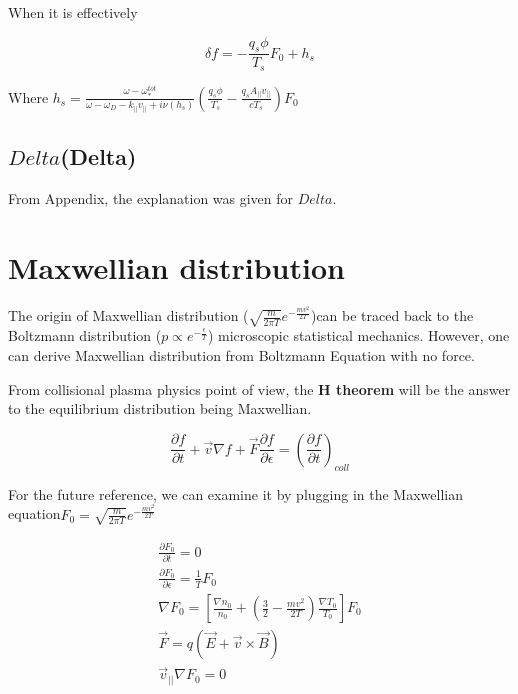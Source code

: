 When it is effectively 

\begin{equation}
    \delta f =-\frac{q_s\phi}{T_s}F_0+h_s
    \label{eq:adiabatic}
\end{equation}

Where $
    h_s 
    =\frac{\omega -\omega_*^{tot} 
    }{\omega -\omega_D 
    - k_{||}v_{||}+i\nu(h_s)}\left(\frac{q_s\phi}{T_s}-\frac{q_sA_{||}v_{||}}{cT_s}\right)F_0
$

\subsection{$Delta$(Delta)}

From \cite{tearing_parity} Appendix, the explanation was given for $Delta$. 



\section{Maxwellian distribution}

The origin of Maxwellian distribution ($\sqrt{\frac{m}{2\pi  T}}e^{-\frac{mv^2}{2T}}$)can be traced back to the Boltzmann distribution ($p\propto e^{-\frac{\epsilon}{T}}$) microscopic statistical mechanics. However, one can derive Maxwellian distribution from Boltzmann Equation with no force. 

From collisional plasma physics point of view, the\textbf{ H theorem} will be the answer to the equilibrium distribution being Maxwellian. 

\begin{equation}
    \frac{\partial f}{\partial t} +\Vec{v} \nabla f +\Vec{F}\frac{\partial f}{\partial \epsilon}=(\frac{\partial f}{\partial t})_{coll}
\end{equation}

For the future reference, we can examine it by plugging in the Maxwellian equation$F_0=\sqrt{\frac{m}{2\pi T}}e^{-\frac{mv^2}{2T}}$

\begin{eqnarray}
 \frac{\partial F_0}{\partial t}=0\\
 \frac{\partial F_0}{\partial \epsilon}=\frac{1}{T}F_0\\
 \nabla F_0 = \left[\frac{\nabla n_0}{n_0}+(\frac{3}{2}-\frac{mv^2}{2T})\frac{\nabla T_0}{T_0}\right]F_0\\
 \vec{F}=q(\vec{E}+\vec{v}\times \vec{B})\\
 \vec{v}_{||}\nabla F_0=0
\end{eqnarray}

